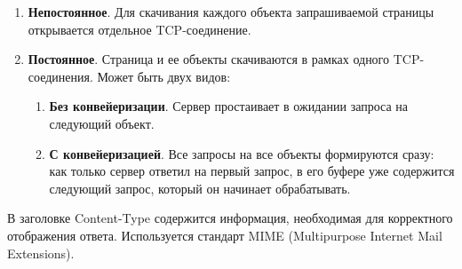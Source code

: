 \begin{enumerate}
    \item \textbf{Непостоянное}. Для скачивания каждого объекта запрашиваемой страницы открывается отдельное TCP-соединение.
    \item \textbf{Постоянное}. Страница и ее объекты скачиваются в рамках одного TCP-соединения. Может быть двух видов:
          \begin{enumerate}
              \item \textbf{Без конвейеризации}. Сервер простаивает в ожидании запроса на следующий объект.
              \item \textbf{С конвейеризацией}. Все запросы на все объекты формируются сразу: как только сервер ответил на первый запрос, в его буфере уже содержится следующий запрос, который он начинает обрабатывать.
          \end{enumerate}
\end{enumerate}

В заголовке Content-Type содержится информация, необходимая для корректного отображения ответа. Используется стандарт MIME (Multipurpose Internet Mail Extensions).